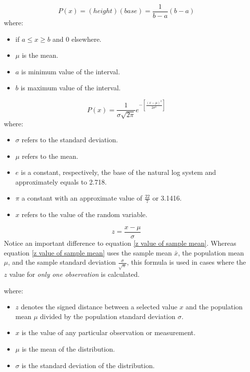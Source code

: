 \begin{equation}
\label{uniform distribution probability}
P(x) = (height)(base) = \frac{1}{b - a}(b-a)
\end{equation}
where: 
\begin{itemize}
 \item if $a \leq x \geq b$ and 0 elsewhere.
 \item $\mu$ is the mean.
 \item $a$ is minimum value of the interval.
 \item $b$ is maximum value of the interval.
\end{itemize}
\hformbar


\begin{equation}
\label{normal probability distribution}
P(x) = \frac{1}{\sigma\sqrt{2\pi}}e^{-\left[\frac{(x - \mu)^2}{2\sigma^2}  \right]}
\end{equation}
where: 
\begin{itemize}
 \item $\sigma$ refers to the standard deviation.
 \item $\mu$ refers to the mean.
 \item $e$ is a constant, respectively, the base of the natural log system and approximately equals to 2.718.
 \item $\pi$ a constant with an approximate value of $\frac{22}{7}$ or 3.1416.
 \item $x$ refers to the value of the random variable.
\end{itemize}
\hformbar


\begin{equation}
\label{standard normal value}
z = \frac{x - \mu}{\sigma}
\end{equation}
Notice an important difference to equation \eqref{z value of sample mean}. Whereas equation \eqref{z value of sample mean} uses the sample mean $\bar{x}$, the population mean $\mu$, and the sample standard deviation $\frac{\sigma}{\sqrt{n}}$, this formula is used in cases where the $z$ value for \textit{only one observation} is calculated.

where: 
\begin{itemize}
 \item $z$ denotes the signed distance between a selected value $x$ and the population mean $\mu$ divided by the population standard deviation $\sigma$.
 \item $x$ is the value of any particular observation or measurement.
 \item $\mu$ is the mean of the distribution.
 \item $\sigma$ is the standard deviation of the distribution.
\end{itemize}
\hformbar


